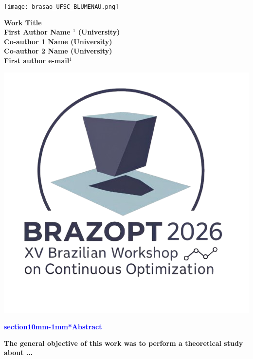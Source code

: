\documentclass[a0,portrait]{a0poster}
\makeatletter
\renewcommand{\LARGE}{\fontsize{50}{70}\selectfont\bfseries} %
\renewcommand{\large}{\fontsize{40}{50}\selectfont\bfseries}
\renewcommand{\huge}{\fontsize{70}{80}\selectfont\bfseries} %
\renewcommand{\section}{\@startsection%
  {section}{1}{0mm}{-\baselineskip}{1mm}{\LARGE\color{myred}\bfseries}}
\makeatother
\begin{document}
\begin{center}
\parbox{0.2\textwidth}{
\begin{center}
\hspace{10cm}
\texttt{[image: brasao\_UFSC\_BLUMENAU.png]}
\end{center}}
\parbox{0.50\textwidth}{
\begin{center}
\textrm{{\huge {\color{myblue} \textbf{
			Work Title}}}\\[1ex]
\bigskip
{\LARGE First Author Name $^1$ (University)}\\[1ex]
{\LARGE Co-author 1 Name (University)\\ 
	\vspace{0.2cm} Co-author 2  Name (University)}\\[1ex]
{\large First author e-mail$^1$}}\\[1ex]
\end{center}
}
\parbox{0.2\textwidth}{
\begin{center}
\includegraphics[scale=1.1]{BrazOpt_LOGO.png}
\end{center}}
\parbox{0.9\textwidth}{
\begin{center}
\large
 \textcolor{blue}{\section*{Abstract}}
 \end{center}
  \large
The general objective of this work was to perform a theoretical study about ...}
\end{center}
\end{document}
